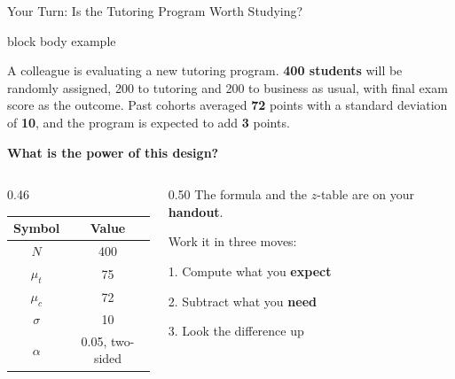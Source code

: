 \documentclass[
  ignorenonframetext,
  aspectratio=169,
]{beamer}
\newenvironment{notebox}{%
  \begin{center}%
  \begin{minipage}{0.95\textwidth}%
  \begin{beamercolorbox}[wd=\textwidth, sep=6pt]{block body example}%
}{%
  \end{beamercolorbox}%
  \end{minipage}%
  \end{center}%
}
\begin{document}
\begin{frame}{Your Turn: Is the Tutoring Program Worth Studying?}
\label{your-turn-is-the-tutoring-program-worth-studying}
\vspace{0.5em}

\begin{notebox}
\small A colleague is evaluating a new tutoring program. \textbf{400 students} will be randomly assigned, 200 to tutoring and 200 to business as usual, with final exam score as the outcome. Past cohorts averaged \textbf{72} points with a standard deviation of \textbf{10}, and the program is expected to add \textbf{3} points.
\end{notebox}

\vspace{0.7em}

\begin{center}
\large \textbf{What is the power of this design?}
\end{center}

\vspace{0.7em}

\begin{columns}[c]

\begin{column}{0.46\textwidth}
\begin{center}
\footnotesize
\setlength{\tabcolsep}{10pt}
\renewcommand{\arraystretch}{1.2}
\begin{tabular}{cc}
\toprule
\textbf{Symbol} & \textbf{Value} \\
\midrule
$N$      & 400  \\
$\mu_t$  & 75   \\
$\mu_c$  & 72   \\
$\sigma$ & 10   \\
$\alpha$ & 0.05, two-sided \\
\bottomrule
\end{tabular}
\end{center}
\end{column}

\begin{column}{0.50\textwidth}
\footnotesize
The formula and the $z$-table are on your \textbf{handout}.

\vspace{0.6em}

Work it in three moves:

\vspace{0.3em}

\hspace{0.4em}1. Compute what you \textbf{expect}

\vspace{0.2em}

\hspace{0.4em}2. Subtract what you \textbf{need}

\vspace{0.2em}

\hspace{0.4em}3. Look the difference up
\end{column}

\end{columns}
\end{frame}
\end{document}
